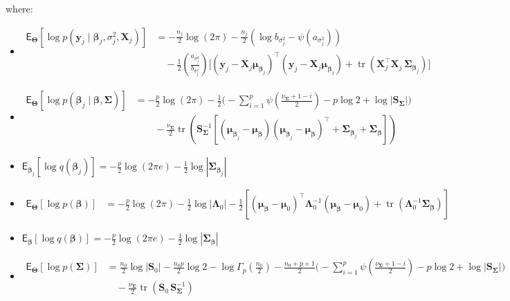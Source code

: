 \begin{itemize}
where:

\begin{itemize}

\item
$
\begin{aligned}
\mathsf{E}_{\bm{\Theta}}\left[\log p\left(\bm{y}_j \mid \bm{\beta}_j, \sigma_j^2, \mathbf{X}_j \right)\right]
&= -\tfrac{n_j}{2}\log(2\pi)
-\tfrac{n_j}{2}\left(\log b_{\sigma_j^2}-\psi(a_{\sigma_j^2})\right) \\
&\quad -\tfrac{1}{2}\left(\tfrac{a_{\sigma_j^2}}{b_{\sigma_j^2}}\right)
\Big[
(\bm{y}_j-\mathbf{X}_j\bm{\mu}_{\bm{\beta}_j})^\top(\bm{y}_j-\mathbf{X}_j\bm{\mu}_{\bm{\beta}_j})
+\operatorname{tr}\!\left(\mathbf{X}_j^\top\mathbf{X}_j\,\bm{\Sigma}_{\bm{\beta}_j}\right)
\Big]
\end{aligned}
$

\item
$
\begin{aligned}
\mathsf{E}_{\bm{\Theta}}\left[\log p\left(\bm{\beta}_j \mid \bm{\beta}, \bm{\Sigma}\right)\right]
&= -\tfrac{p}{2}\log(2\pi)
-\tfrac{1}{2}\Bigg(
-\sum_{i=1}^{p}\psi\left(\tfrac{\nu_{\bm{\Sigma}}+1-i}{2}\right)
-p\log 2 + \log|\bm{S}_{\bm{\Sigma}}|
\Bigg) \\
&\qquad -\tfrac{\nu_{\bm{\Sigma}}}{2}\operatorname{tr}\left(\bm{S}_{\bm{\Sigma}}^{-1}\left[
(\bm{\mu}_{\bm{\beta}_j}-\bm{\mu}_{\bm{\beta}})
(\bm{\mu}_{\bm{\beta}_j}-\bm{\mu}_{\bm{\beta}})^\top
+\bm{\Sigma}_{\bm{\beta}_j}+\bm{\Sigma}_{\bm{\beta}}
\right]\right)
\end{aligned}
$

\item
$
\mathsf{E}_{\bm{\beta}_j}\left[\log q(\bm{\beta}_j)\right]
= -\tfrac{p}{2}\log(2\pi e)-\tfrac{1}{2}\log|\bm{\Sigma}_{\bm{\beta}_j}|
$

\item
$
\begin{aligned}
\mathsf{E}_{\bm{\Theta}}\left[\log p(\bm{\beta})\right]
&= -\tfrac{p}{2}\log(2\pi)-\tfrac{1}{2}\log|\bm{\Lambda}_0| -\tfrac{1}{2}\left[
(\bm{\mu}_{\bm{\beta}}-\bm{\mu}_0)^\top\bm{\Lambda}_0^{-1}(\bm{\mu}_{\bm{\beta}}-\bm{\mu}_0)
+\operatorname{tr}\!\left(\bm{\Lambda}_0^{-1}\bm{\Sigma}_{\bm{\beta}}\right)
\right]
\end{aligned}
$

\item
$
\mathsf{E}_{\bm{\beta}}\left[\log q\left(\bm{\beta}\right)\right]
= -\tfrac{p}{2}\log(2\pi e)-\tfrac{1}{2}\log|\bm{\Sigma}_{\bm{\beta}}|
$

\item
$
\begin{aligned}
\mathsf{E}_{\bm{\Theta}}\left[\log p\left(\bm{\Sigma}\right)\right]
&= \tfrac{n_0}{2}\log|\bm{S}_0|-\tfrac{n_0 p}{2}\log 2-\log\Gamma_p\left(\tfrac{n_0}{2}\right)  -\tfrac{n_0+p+1}{2}\Bigg(
-\sum_{i=1}^{p}\psi\!\left(\tfrac{\nu_{\bm{\Sigma}}+1-i}{2}\right)-p\log 2+\log|\bm{S}_{\bm{\Sigma}}|
\Bigg) \\
&\quad -\tfrac{\nu_{\bm{\Sigma}}}{2}\operatorname{tr}\left(\bm{S}_0\,\bm{S}_{\bm{\Sigma}}^{-1}\right)
\end{aligned}
$


\end{itemize}
\end{itemize}
